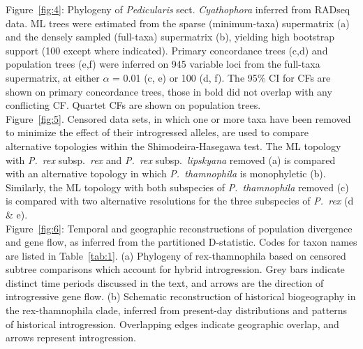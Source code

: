 \documentclass[12pt,letterpaper]{article}
\begin{document}
\noindent Figure~\ref{fig:4}: Phylogeny of \emph{Pedicularis} sect. \emph{Cyathophora} inferred from RADseq data. ML trees were estimated from the sparse (minimum-taxa) supermatrix (a) and the densely sampled (full-taxa) supermatrix (b), yielding high bootstrap support (100 except where indicated). Primary concordance trees (c,d) and population trees (e,f) were inferred on 945 variable loci from the full-taxa supermatrix, at either $\alpha$ = 0.01 (c, e) or 100 (d, f). The 95\% CI for CFs are shown on primary concordance trees, those in bold did not overlap with any conflicting CF. Quartet CFs are shown on population trees. \\

\noindent Figure~\ref{fig:5}. Censored data sets, in which one or more taxa have been removed to minimize the effect of their introgressed alleles, are used to compare alternative topologies within the Shimodeira-Hasegawa test. The ML topology with \emph{P.~rex} subsp.\ \emph{rex} and \emph{P.~rex} subsp.\ \emph{lipskyana} removed (a) is compared with an alternative topology in which \emph{P.~thamnophila} is monophyletic (b). Similarly, the ML topology with both subspecies of \emph{P.~thamnophila} removed (c) is compared with two alternative resolutions for the three subspecies of \emph{P.~rex} (d \& e). \\

\noindent Figure~\ref{fig:6}: Temporal and geographic reconstructions of population divergence and gene flow, as inferred from the partitioned D-statistic. Codes for taxon names are listed in Table~\ref{tab:1}. (a) Phylogeny of rex-thamnophila based on censored subtree comparisons which account for hybrid introgression. Grey bars indicate distinct time periods discussed in the text, and arrows are the direction of introgressive gene flow. (b) Schematic reconstruction of historical biogeography in the rex-thamnophila clade, inferred from present-day distributions and patterns of historical introgression. Overlapping edges indicate geographic overlap, and arrows represent introgression. \\


\clearpage
\newpage

\begin{figure}
\begin{center}
\end{center}
\caption{}
\label{fig:1}
\end{figure}

\begin{figure}
\begin{center}
\end{center}
\caption{}
\label{fig:2}
\end{figure}
\end{document}
